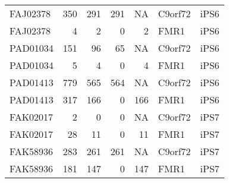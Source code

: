 \begin{longtable}{lrrrrll}
FAJ02378 & 350   & 291   & 291       & NA       & C9orf72 & iPS6    \\
FAJ02378 & 4     & 2     & 0         & 2        & FMR1    & iPS6    \\
PAD01034 & 151   & 96    & 65        & NA       & C9orf72 & iPS6    \\
PAD01034 & 5     & 4     & 0         & 4        & FMR1    & iPS6    \\
PAD01413 & 779   & 565   & 564       & NA       & C9orf72 & iPS6    \\
PAD01413 & 317   & 166   & 0         & 166      & FMR1    & iPS6    \\
FAK02017 & 2     & 0     & 0         & NA       & C9orf72 & iPS7    \\
FAK02017 & 28    & 11    & 0         & 11       & FMR1    & iPS7    \\
FAK58936 & 283   & 261   & 261       & NA       & C9orf72 & iPS7    \\
FAK58936 & 181   & 147   & 0         & 147      & FMR1    & iPS7   
\end{longtable}




